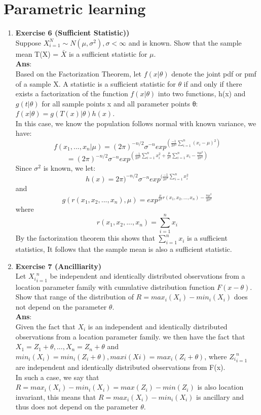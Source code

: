 \documentclass{article}
\begin{document}
\section{Parametric learning}
\begin{enumerate}
\item \textbf{Exercise 6 (Sufficient Statistic))} \\
Suppose $X_{i=1}^{N} \sim N(\mu,\sigma^2), \sigma < \infty$ and is known. Show that the sample mean T(X) = $\bar X $ is a sufficient statistic for $\mu$. \\
\textbf{Ans}: \\

Based on the Factorization Theorem, let $f(x|\theta)$ denote the joint pdf or pmf of a sample X. A statistic is a sufficient statistic for $\theta$ if and only if there exists a factorization of the function $f(x|\theta)$ into two functions, h(x) and $g(t|θ)$ for all sample points x and all parameter points θ: $f(x|\theta)=g(T(x)|\theta)h(x)$. \\

In this case, we know the population follows normal with known variance, we have: 
$$
f(x_1,...,x_n|\mu)=(2\pi)^{-n/2}\sigma^{-n}exp^{(\frac{-1}{2\sigma^2}\sum_{i=1}^{n}(x_i-\mu)^2)}
$$
$$
=(2\pi)^{-n/2}\sigma^{-n}exp^{(\frac{-1}{2\sigma^2}\sum_{i=1}^{n}x_i^2+\frac{\mu}{\sigma^2}\sum_{i=1}^{n}x_i-\frac{n\mu^2}{2\sigma^2})}
$$
Since $\sigma^2$ is known, we let: 
$$ h(x)= 2\pi)^{-n/2}\sigma^{-n}exp^{(\frac{-1}{2\sigma^2}\sum_{i=1}^{n}x_i^2}$$ 
and 
$$
g(r(x_1,x_2,...,x_n),\mu)=exp^{\frac{\mu}{\sigma^2} r(x_1,x_2,...,x_n)-\frac{n\mu^2}{2\sigma^2}}
$$
where 
$$
r(x_1,x_2,...,x_n)=\sum_{i=1}^{n}x_i
$$
By the factorization theorem this shows that $\sum_{i=1}^{n}x_i$ is a sufficient statistics, It follows that the sample mean is also a sufficient statistic. \\

\item \textbf{Exercise 7 (Ancilliarity)} \\
Let ${X_i}^n_{i=1}$ be independent and identically distributed observations from a location parameter family with cumulative distribution function $F(x - \theta)$. Show that range of the distribution of $R = max_i(X_i)-min_i(X_i)$ does not depend on the parameter $\theta$. \\ 
\textbf{Ans}: \\

Given the fact that $X_i$ is an independent and identically distributed observations from a location parameter family. we then have the fact that$X_1 = Z_1+\theta, ..., X_n= Z_n + \theta$ and $min_i(X_i) = min_i(Z_i + \theta), maxi(Xi) = max_i(Z_i + \theta)$, where ${Z_i}^n_{i=1}$ are independent and identically distributed observations from F(x). \\
In such a case, we say that $R = max_i(X_i)-min_i(X_i)=max(Z_i)-min(Z_i)$ is also location invariant, this means that $R = max_i(X_i)-min_i(X_i)$ is ancillary and thus does not depend on  the parameter $\theta$. \\


\end{enumerate}
\end{document}
